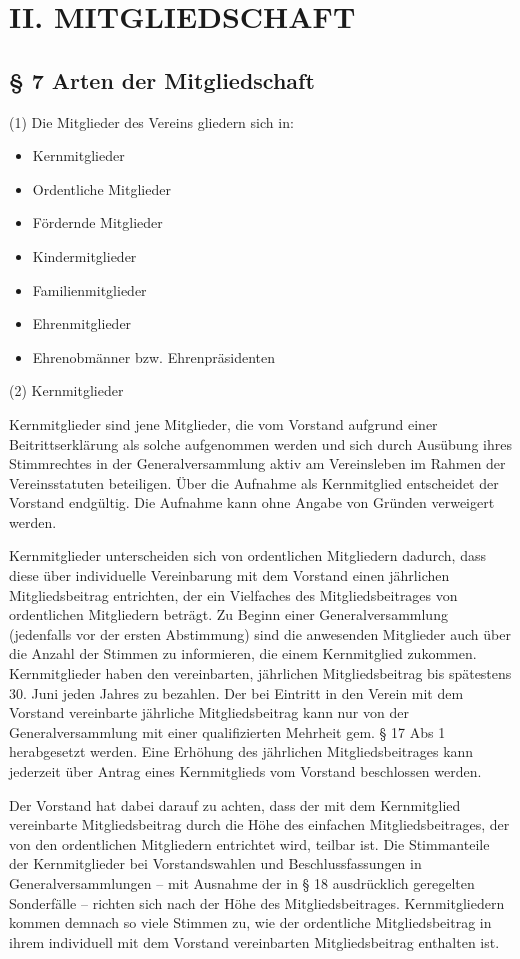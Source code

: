 \documentclass[11pt,a4paper]{article}
\begin{document}
\section{II. MITGLIEDSCHAFT}

\subsection{§ 7
Arten der Mitgliedschaft}

(1)
Die Mitglieder des Vereins gliedern sich in:

\begin{itemize}
\item
Kernmitglieder
\item
Ordentliche Mitglieder
\item
Fördernde Mitglieder
\item
Kindermitglieder
\item
Familienmitglieder
\item
Ehrenmitglieder
\item
Ehrenobmänner bzw. Ehrenpräsidenten
\end{itemize}

(2)
Kernmitglieder

Kernmitglieder sind jene Mitglieder, die vom Vorstand aufgrund einer Beitrittserklärung als solche aufgenommen werden und sich durch Ausübung ihres Stimmrechtes in der Generalversammlung aktiv am Vereinsleben im Rahmen der Vereinsstatuten beteiligen.
Über die Aufnahme als Kernmitglied entscheidet der Vorstand endgültig.
Die Aufnahme kann ohne Angabe von Gründen verweigert werden.

Kernmitglieder unterscheiden sich von ordentlichen Mitgliedern dadurch, dass diese über individuelle Vereinbarung mit dem Vorstand einen jährlichen Mitgliedsbeitrag entrichten, der ein Vielfaches des Mitgliedsbeitrages von ordentlichen Mitgliedern beträgt.
Zu Beginn einer Generalversammlung (jedenfalls vor der ersten Abstimmung) sind die anwesenden Mitglieder auch über die Anzahl der Stimmen zu informieren, die einem Kernmitglied zukommen.
Kernmitglieder haben den vereinbarten, jährlichen Mitgliedsbeitrag bis spätestens 30. Juni jeden Jahres zu bezahlen.
Der bei Eintritt in den Verein mit dem Vorstand vereinbarte jährliche Mitgliedsbeitrag kann nur von der Generalversammlung mit einer qualifizierten Mehrheit gem. § 17 Abs 1 herabgesetzt werden.
Eine Erhöhung des jährlichen Mitgliedsbeitrages kann jederzeit über Antrag eines Kernmitglieds vom Vorstand beschlossen werden.

Der Vorstand hat dabei darauf zu achten, dass der mit dem Kernmitglied vereinbarte Mitgliedsbeitrag durch die Höhe des einfachen Mitgliedsbeitrages, der von den ordentlichen Mitgliedern entrichtet wird, teilbar ist.
Die Stimmanteile der Kernmitglieder bei Vorstandswahlen und Beschlussfassungen in Generalversammlungen – mit Ausnahme der in § 18 ausdrücklich geregelten Sonderfälle – richten sich nach der Höhe des Mitgliedsbeitrages.
Kernmitgliedern kommen demnach so viele Stimmen zu, wie der ordentliche Mitgliedsbeitrag in ihrem individuell mit dem Vorstand vereinbarten Mitgliedsbeitrag enthalten ist.
\end{document}
